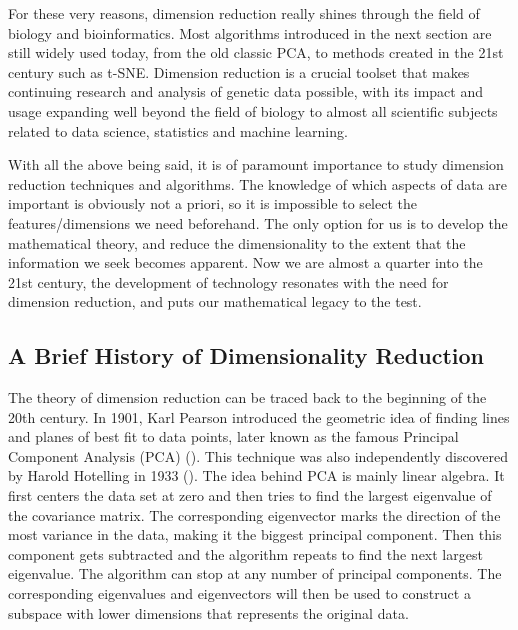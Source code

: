 For these very reasons, dimension reduction really shines through the field of
biology and bioinformatics. Most algorithms introduced in the next section are
still widely used today, from the old classic PCA, to methods created in the 21st
century such as t-SNE. Dimension reduction is a crucial toolset that makes
continuing research and analysis of genetic data possible, with its impact and
usage expanding well beyond the field of biology to almost all scientific
subjects related to data science, statistics and machine learning.

With all the above being said, it is of paramount importance to study dimension
reduction techniques and algorithms. The knowledge of which aspects of data are
important is obviously not a priori, so it is impossible to select the
features/dimensions we need beforehand. The only option for us is to develop
the mathematical theory, and reduce the dimensionality to the extent that the
information we seek becomes apparent. Now we are almost a quarter into the 21st
century, the development of technology resonates with the need for dimension
reduction, and puts our mathematical legacy to the test.
\subsection{A Brief History of Dimensionality Reduction} \label{intro_chap:sec:tsne:DR}
The theory of dimension reduction can be traced back to the beginning of the 20th
century. In 1901, Karl Pearson introduced the geometric idea of finding lines
and planes of best fit to data points, later known as the famous Principal
Component Analysis (PCA) (\cite{Pearson1901PCA}). This technique was also
independently discovered by Harold Hotelling in 1933 (\cite{Hotelling1933}).
The idea behind PCA is mainly linear algebra. It first centers the data set at
zero and then tries to find the largest eigenvalue of the covariance matrix.
The corresponding eigenvector marks the direction of the most variance in the
data, making it the biggest principal component. Then this component gets
subtracted and the algorithm repeats to find the next largest eigenvalue. The
algorithm can stop at any number of principal components. The corresponding
eigenvalues and eigenvectors will then be used to construct a subspace with
lower dimensions that represents the original data.


